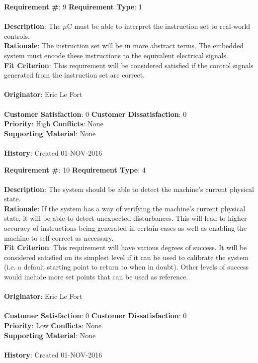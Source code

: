 \documentclass[titlepage]{article}
\begin{document}
\begin{framed}
	\noindent\textbf{Requirement \#}: 9 \hfill \textbf{Requirement Type}: 1 \hfill\\\\
	\noindent\textbf{Description}: The $\mu$C must be able to interpret the instruction set to real-world controls.\\
	\textbf{Rationale}: The instruction set will be in more abstract terms.  The embedded system must encode these instructions to the equivalent electrical signals.\\
	\textbf{Fit Criterion}: This requirement will be considered satisfied if the control signals generated from the instruction set are correct.\\\\
	\textbf{Originator}: Eric Le Fort\\\\
	\noindent\textbf{Customer Satisfaction}: 0 \hfill 	\textbf{Customer Dissatisfaction}: 0 \hfill\\
	\textbf{Priority}: High \hfill \textbf{Conflicts}: None \hfill\\
	\textbf{Supporting Material}: None\\\\
	\noindent\textbf{History}: Created 01-NOV-2016
\end{framed}

\begin{framed}
	\noindent\textbf{Requirement \#}: 10 \hfill \textbf{Requirement Type}: 4 \hfill\\\\
	\noindent\textbf{Description}: The system should be able to detect the machine's current physical state.\\
	\textbf{Rationale}: If the system has a way of verifying the machine's current physical state, it will be able to detect unexpected disturbances. This will lead to higher accuracy of instructions being generated in certain cases as well as enabling the machine to self-correct as necessary.\\
	\textbf{Fit Criterion}: This requirement will have various degrees of success. It will be considered satisfied on its simplest level if it can be used to calibrate the system (i.e. a default starting point to return to when in doubt). Other levels of success would include more set points that can be used as reference.\\\\
	\textbf{Originator}: Eric Le Fort\\\\
	\noindent\textbf{Customer Satisfaction}: 0 \hfill 	\textbf{Customer Dissatisfaction}: 0 \hfill\\
	\textbf{Priority}: Low \hfill \textbf{Conflicts}: None \hfill\\
	\textbf{Supporting Material}: None\\\\
	\noindent\textbf{History}: Created 01-NOV-2016
\end{framed}
\end{document}
